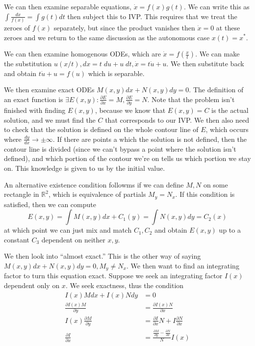 \documentclass[10pt]{article}
\newcommand{\rd}[2]{\frac{d#1}{d#2}}
\newcommand{\pd}[2]{\frac{\partial #1}{\partial#2}}
\begin{document}
We can then examine separable equations, $\dot{x} = f(x)g(t)$. We can write this as $\int \frac{dx}{f(x)} = \int g(t) dt$ then subject this to IVP. This requires that we treat the zeroes of $f(x)$ separately, but since the product vanishes then $\dot{x} = 0$ at these zeroes and we return to the same discussion as the autonomous case $x(t) = x^*$. 

We can then examine homogenous ODEs, which are $\dot{x} = f\left( \frac{x}{t} \right)$. We can make the substitution $u(x/t), dx = t\; du + u\; dt, \dot{x} = t\dot{u} + u$. We then substitute back and obtain $t\dot{u} + u = f(u)$ which is separable.

We then examine exact ODEs $M(x,y)dx + N(x,y) dy = 0$. The definition of an exact function is $\exists E(x,y): \pd{E}{x} = M, \pd{E}{y} = N$. Note that the problem isn't finished with finding $E(x,y)$, because we know that $E(x,y) = C$ is the actual solution, and we must find the $C$ that corresponds to our IVP. We then also need to check that the solution is defined on the whole contour line of $E$, which occurs where $\rd{y}{x} \to \pm \infty$. If there are points a which the solution is not defined, then the contour line is divided (since we can't bypass a point where the solution isn't defined), and which portion of the contour we're on tells us which portion we stay on. This knowledge is given to us by the initial value. 

An alternative existence condition followms if we can define $M,N$ on some rectangle in $\mathbb{R}^2$, which is equivalence of partials $M_y = N_x$. If this condition is satisfied, then we can compute 
$$E(x,y) = \int M(x,y) dx + C_1(y) = \int N(x,y) dy = C_2(x)$$
at which point we can just mix and match $C_1,C_2$ and obtain $E(x,y)$ up to a constant $C_3$ dependent on neither $x,y$. 

We then look into ``almost exact.'' This is the other way of saying $M(x,y) dx + N(x,y) dy = 0, M_y \neq N_x$. We then want to find an integrating factor to turn this equation exact. Suppose we seek an integrating factor $I(x)$ dependent only on $x$. We seek exactness, thus the condition
\begin{align*}
	I(x) M dx+ I(x)N dy &= 0\\
	\pd{I(x)M}{y} &= \pd{I(x)N}{x}\\
	I(x)\pd{M}{y} &= \pd{I}{x}N + I\pd{N}{x}\\
	\pd{I}{x} &= \frac{\pd{M}{y} - \pd{N}{x}}{N}I(x)
\end{align*}
\end{document}
